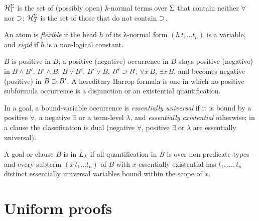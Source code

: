 \begin{definition}\label{def:rules-herbrand}
$\mathcal H_1^\Sigma$ is the set of (possibly open) λ-normal terms over $\Sigma$ that contain neither $\forall$ nor $\supset$; $\mathcal H_2^\Sigma$ is the set of those that do not contain $\supset$.
\end{definition}

\begin{definition}\label{def:rules-rigidatom}
An atom is \emph{flexible} if the head $h$ of its λ-normal form $(h\,t_1\dots t_n)$ is a variable, and \emph{rigid} if $h$ is a non-logical constant.
\end{definition}

\begin{definition}\label{def:rules-polarity}
$B$ is positive in $B$; a positive (negative) occurrence in $B$ stays positive (negative) in $B\wedge B'$, $B'\wedge B$, $B\vee B'$, $B'\vee B$, $B'\supset B$, $\forall x\,B$, $\exists x\,B$, and becomes negative (positive) in $B\supset B'$.
A hereditary Harrop formula is one in which no positive subformula occurrence is a disjunction or an existential quantification.
\end{definition}

\begin{definition}\label{def:rules-essential}
In a goal, a bound-variable occurrence is \emph{essentially universal} if it is bound by a positive $\forall$, a negative $\exists$ or a term-level $\lambda$, and \emph{essentially existential} otherwise; in a clause the classification is dual (negative $\forall$, positive $\exists$ or $\lambda$ are essentially universal).
\end{definition}

\begin{definition}\label{def:rules-llambda}
A goal or clause $B$ is in $L_\lambda$ if all quantification in $B$ is over non-predicate types and every subterm $(x\,t_1\dots t_n)$ of $B$ with $x$ essentially existential has $t_1,\dots,t_n$ distinct essentially universal variables bound within the scope of $x$.
\end{definition}

\section{Uniform proofs}\label{sec:rules-uniform}

